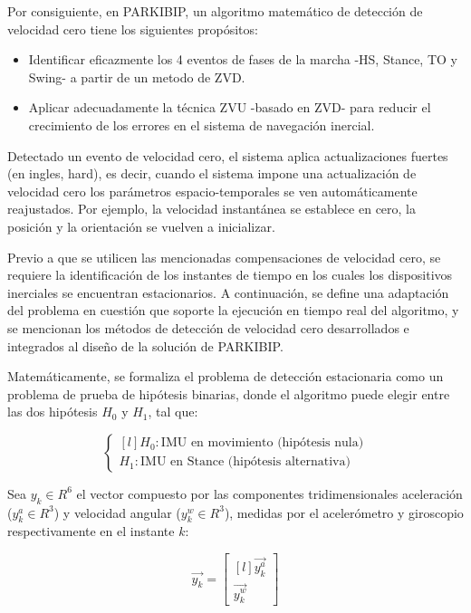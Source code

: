 Por consiguiente, en PARKIBIP, un algoritmo matemático de detección de velocidad cero tiene los siguientes propósitos:
\begin{itemize}
    \item Identificar eficazmente los  4 eventos de fases de la marcha -HS, Stance, TO y Swing- a partir de un metodo de ZVD.
    \item Aplicar adecuadamente la técnica ZVU -basado en ZVD- para reducir el crecimiento de los errores en el sistema de navegación inercial.
\end{itemize}

Detectado un evento de velocidad cero, el sistema aplica actualizaciones fuertes (en ingles, hard), es decir, cuando el sistema impone una actualización de velocidad cero los parámetros espacio-temporales se ven automáticamente reajustados. Por ejemplo, la velocidad instantánea se establece en cero, la posición y la orientación se vuelven a inicializar.

\noindent Previo a que se utilicen las mencionadas compensaciones de velocidad cero, se requiere la identificación de los instantes de tiempo en los cuales los dispositivos inerciales se encuentran estacionarios. A continuación, se define una adaptación del problema en cuestión que soporte la ejecución en tiempo real del algoritmo, y se mencionan los métodos de detección de velocidad cero desarrollados e integrados al diseño de la solución de PARKIBIP.

Matemáticamente, se formaliza el problema de detección estacionaria como un problema de prueba de hipótesis binarias, donde el algoritmo puede elegir entre las dos hipótesis $H_0$ y $H_1$, tal que:

\[\left\{ 
    \begin{matrix*}[l]
     H_0: \text{IMU en movimiento (hipótesis nula)}\\
     H_1: \text{IMU en Stance (hipótesis alternativa)}
    \end{matrix*}
\right. \]

\noindent Sea $y_k \in R^6$ el vector compuesto por las componentes tridimensionales aceleración ($y_k^a \in R^3$) y velocidad angular ($y_k^w \in R^3$), medidas por el acelerómetro y giroscopio respectivamente en el instante $k$:

\[
     \vec{y_k} = \begin{bmatrix*}[l]
     \vec{y_k^a}\\
     \vec{y_k^w}
    \end{bmatrix*}
\]

